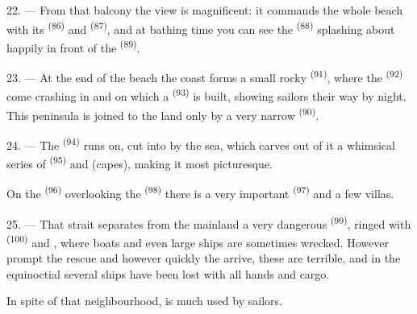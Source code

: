 22. --- From that balcony the view is magnificent: it commands the whole beach with its
 \textsuperscript{(86)} and  \textsuperscript{(87)}, and at
bathing time you can see the  \textsuperscript{(88)} splashing about happily
in front of the  \textsuperscript{(89)}.

23. --- At the end of the beach the coast forms a small rocky
 \textsuperscript{(91)}, where the  \textsuperscript{(92)}
come crashing in and on which a  \textsuperscript{(93)} is built, showing
sailors their way by night. This peninsula is joined to the land only by a very narrow
 \textsuperscript{(90)}.

\VUsaut{3.0mm}
\VUsaut{3.0mm}

24. --- The  \textsuperscript{(94)} runs on, cut into by the sea, which carves
out of it a whimsical series of  \textsuperscript{(95)} and
 (capes), making it most picturesque.

On the  \textsuperscript{(96)} overlooking the 
\textsuperscript{(98)} there is a very important  \textsuperscript{(97)} and a
few villas.

25. --- That strait separates from the mainland a very dangerous
 \textsuperscript{(99)}, ringed with  \textsuperscript{(100)} and
, where boats and even large ships are sometimes wrecked. However
prompt the rescue and however quickly the  arrive, these 
are terrible, and in the equinoctial  several ships have been lost with all
hands and cargo.

In spite of that neighbourhood,  is much used by sailors.
\VUsaut{6.0mm}
\VUfilet{22mm}
